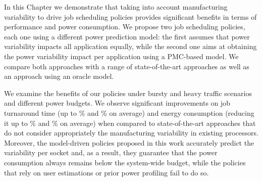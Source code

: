 In this Chapter we demonstrate that taking into account manufacturing variability to drive 
job scheduling policies provides significant benefits in terms of performance and power 
consumption. We propose two job scheduling policies, each one using a different power 
prediction model: the first assumes that power variability impacts all application equally, 
while the second one aims at obtaining the power variability impact per application using a 
PMC-based model. We compare both approaches with a range of state-of-the-art approaches as 
well as an approach using an oracle model. 
\par
We examine the benefits of our policies under bursty and heavy traffic scenarios and different power budgets.  We observe significant improvements on job turnaround time 
(up to \MaxJTT\% and \AvgJTT\% on average) and energy consumption (reducing it up to 
\MaxEnergy\% and \AvgEnergy\% on average) when compared to state-of-the-art approaches that 
do not consider appropriately the manufacturing variability in existing processors.
Moreover, the model-driven policies proposed in this work accurately predict the variability 
per socket and, as a result, they guarantee that the power consumption always remains below 
the system-wide budget, while the policies that rely on user estimations or prior power 
profiling fail to do so.
   
